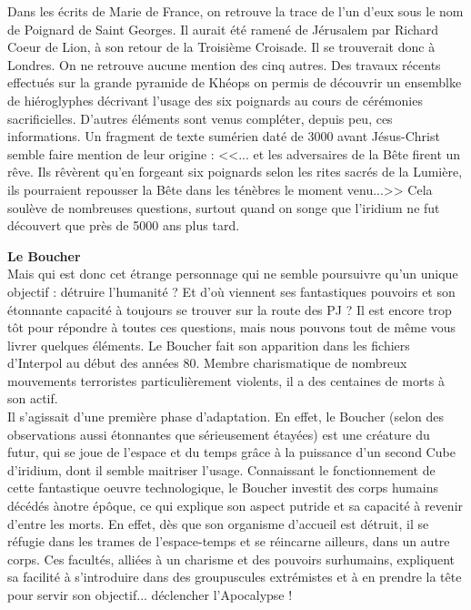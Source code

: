 \documentclass[11pt,twoside,a4paper]{book}
\begin{document}
Dans les {\'e}crits de Marie de France, on retrouve la trace de l'un d'eux sous le nom de Poignard de Saint Georges. Il aurait {\'e}t{\'e} ramen{\'e} de J{\'e}rusalem par Richard Coeur de Lion, {\`a} son retour de la Troisi{\`e}me Croisade. Il se trouverait donc {\`a} Londres. On ne retrouve aucune mention des cinq autres. Des travaux r{\'e}cents effectu{\'e}s sur la grande pyramide de Kh{\'e}ops on permis de d{\'e}couvrir un ensemblke de hi{\'e}roglyphes d{\'e}crivant l'usage des six poignards au cours de c{\'e}r{\'e}monies sacrificielles. D'autres {\'e}l{\'e}ments sont venus compl{\'e}ter, depuis peu, ces informations. Un fragment de texte sum{\'e}rien dat{\'e} de 3000 avant J{\'e}sus-Christ semble faire mention de leur origine : <<... et les adversaires de la B{\^e}te firent un r{\^e}ve. Ils r{\^e}v{\`e}rent qu'en forgeant six poignards selon les rites sacr{\'e}s de la Lumi{\`e}re, ils pourraient repousser la B{\^e}te dans les t{\'e}n{\`e}bres le moment venu...>> Cela soul{\`e}ve de nombreuses questions, surtout quand on songe que l'iridium ne fut d{\'e}couvert que pr{\`e}s de 5000 ans plus tard. ~\\

\clearpage

\textbf{\large Le Boucher} ~\\

Mais qui est donc cet {\'e}trange personnage qui ne semble poursuivre qu'un unique objectif : d{\'e}truire l'humanit{\'e} ? Et d'o{\`u} viennent ses fantastiques pouvoirs et son {\'e}tonnante capacit{\'e} {\`a} toujours se trouver sur la route des PJ ? Il est encore trop t{\^o}t pour r{\'e}pondre {\`a} toutes ces questions, mais nous pouvons tout de m{\^e}me vous livrer quelques {\'e}l{\'e}ments. Le Boucher fait son apparition dans les fichiers d'Interpol au d{\'e}but des ann{\'e}es 80. Membre charismatique de nombreux mouvements terroristes particuli{\`e}rement violents, il a des centaines de morts {\`a} son actif. ~\\

Il s'agissait d'une premi{\`e}re phase d'adaptation. En effet, le Boucher (selon des observations aussi {\'e}tonnantes que s{\'e}rieusement {\'e}tay{\'e}es) est une cr{\'e}ature du futur, qui se joue de l'espace et du temps gr{\^a}ce {\`a} la puissance d'un second Cube d'iridium, dont il semble maitriser l'usage. Connaissant le fonctionnement de cette fantastique oeuvre technologique, le Boucher investit des corps humains d{\'e}c{\'e}d{\'e}s {\`a}notre {\'e}p{\^o}que, ce qui explique son aspect putride et sa capacit{\'e} {\`a} revenir d'entre les morts. En effet, d{\`e}s que son organisme d'accueil est d{\'e}truit, il se r{\'e}fugie dans les trames de l'espace-temps et se r{\'e}incarne ailleurs, dans un autre corps. Ces facult{\'e}s, alli{\'e}es {\`a} un charisme et des pouvoirs surhumains, expliquent sa facilit{\'e} {\`a} s'introduire dans des groupuscules extr{\'e}mistes et {\`a} en prendre la t{\^e}te pour servir son objectif... d{\'e}clencher l'Apocalypse !
\end{document}

